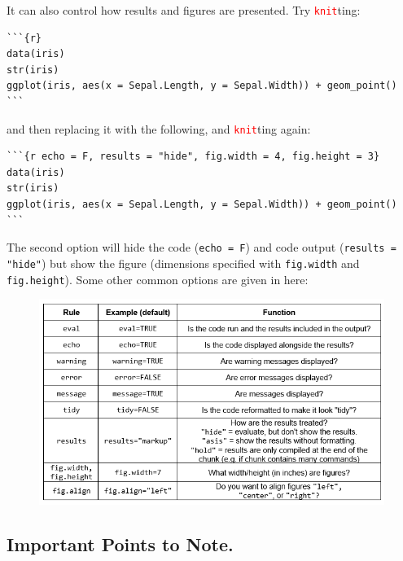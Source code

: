 \documentclass[a4paper,12pt]{article}
\newcommand\code[1]{\textcolor{red}{\texttt{#1}}}
\begin{document}
It can also control how results and figures are presented. Try \code{knit}ting:

\begin{shaded}
\begin{verbatim}
```{r}
data(iris)
str(iris)
ggplot(iris, aes(x = Sepal.Length, y = Sepal.Width)) + geom_point()
```
\end{verbatim}
\end{shaded}

and then replacing it with the following, and \code{knit}ting again:

\begin{shaded}
\begin{verbatim}
```{r echo = F, results = "hide", fig.width = 4, fig.height = 3}
data(iris)
str(iris)
ggplot(iris, aes(x = Sepal.Length, y = Sepal.Width)) + geom_point()
```
\end{verbatim}
\end{shaded}

The second option will hide the code (\texttt{echo = F}) and code output (\texttt{results = "hide"}) but show the figure (dimensions specified with \texttt{fig.width} and \texttt{fig.height}). Some other common options are given in here:

\begin{figure}[h]
\centering 
\includegraphics[width=1\textwidth]{figs/markdownrulesv2.jpg}
\label{fig:markdownrules}
\end{figure} 

\vspace*{-1.5cm}

\subsection{Important Points to Note.}
\end{document}

